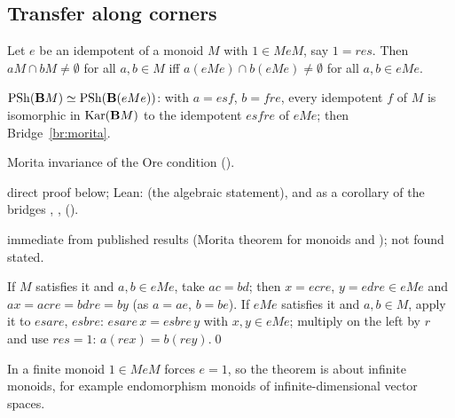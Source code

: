 \subsection{Transfer along corners}

\begin{theorem}\label{th:transfer}
Let $e$ be an idempotent of a monoid $M$ with $1\in MeM$, say $1 = res$. Then $aM\cap bM\neq\emptyset$ for all $a,b\in M$ iff $a(eMe)\cap b(eMe)\neq\emptyset$ for all $a,b\in eMe$.
\end{theorem}

\begin{trace}
\item[deck] $\mathrm{PSh}(\mathbf{B} M)\simeq\mathrm{PSh}(\mathbf{B}(eMe))$: with $a = esf$, $b = fre$, every idempotent $f$ of $M$ is isomorphic in $\operatorname{Kar}(\mathbf{B} M)$ to the idempotent $esfre$ of $eMe$; then Bridge~\ref{br:morita}.
\item[arch] Morita invariance of the Ore condition ().
\item[verify] direct proof below; Lean:  (the algebraic statement), and as a corollary of the bridges , ,  ().
\item[novelty] immediate from published results (Morita theorem for monoids \cite{knauer,banaschewski,rogers-1905} and \cite[Thm~2.31]{hemelaer-rogers}); not found stated.
\end{trace}

\direct{} If $M$ satisfies it and $a,b\in eMe$, take $ac = bd$; then $x = ecre$, $y = edre\in eMe$ and $ax = acre = bdre = by$ (as $a = ae$, $b = be$). If $eMe$ satisfies it and $a,b\in M$, apply it to $esare$, $esbre$: $esare\,x = esbre\,y$ with $x,y\in eMe$; multiply on the left by $r$ and use $res = 1$: $a(rex) = b(rey)$.\qed

In a finite monoid $1\in MeM$ forces $e = 1$, so the theorem is about infinite monoids, for example endomorphism monoids of infinite-dimensional vector spaces.
